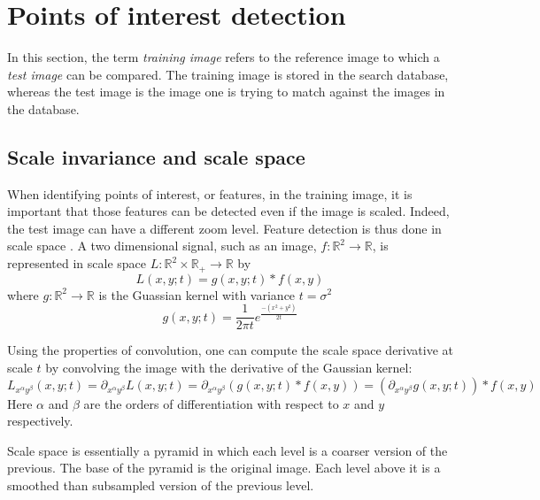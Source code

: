 \section{Points of interest detection}

In this section, the term \emph{training image} refers to the reference image to which a \emph{test image} can be compared. The training image is stored in the search database, whereas the test image is the image one is trying to match against the images in the database.

\subsection{Scale invariance and scale space}
\label{sec:scale_space}

When identifying points of interest, or features, in the training image, it is important that those features can be detected even if the image is scaled. Indeed, the test image can have a different zoom level. Feature detection is thus done in scale space \cite{Lindeberg98featuredetection}. A two dimensional signal, such as an image, $f: \mathbb{R}^2 \to \mathbb{R}$, is represented in scale space $L: \mathbb{R}^2 \times \mathbb{R}_+ \to \mathbb{R}$ by
\begin{equation}
L(x,y;t) = g(x,y;t) \ast f(x,y)
\end{equation}
where $g: \mathbb{R}^2 \to \mathbb{R}$ is the Guassian kernel with variance $t=\sigma^2$
\begin{equation}
g(x,y;t) = \frac{1}{2 \pi t} e ^ \frac{-(x^2+y^2)}{2t}
\end{equation}

Using the properties of convolution, one can compute the scale space derivative at scale $t$ by convolving the image with the derivative of the Gaussian kernel:
\begin{equation}
    L_{x^\alpha y^\beta} (x,y;t) = \partial _{x^\alpha y^\beta} L(x,y;t) = \partial _{x^\alpha y^\beta} (g(x,y;t) \ast f(x,y)) = (\partial _{x^\alpha y^\beta} g(x,y;t)) \ast f(x,y)
\end{equation}
Here $\alpha$ and $\beta$ are the orders of differentiation with respect to $x$ and $y$ respectively.

Scale space is essentially a pyramid in which each level is a coarser version of the previous. The base of the pyramid is the original image. Each level above it is a smoothed than subsampled version of the previous level.


